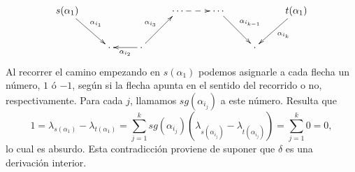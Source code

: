 \documentclass[a4paper,oneside,fleqn,11pt,../tesis.tex]{subfiles}
\begin{document}
\begin{example}
	\begin{align*}
		\xymatrix{
			s(\alpha_1) \ar[rd]^{\alpha_{i_1}} & & & \cdots \ar@{-->}[r]& \cdots\ar[dr]^{\alpha_{i_{k - 1}}} & & t(\alpha_1) \ar[ld]^{\alpha_{i_k}}\\
			& \cdot & \cdot \ar[l]^{\alpha_{i_2}} \ar[ru]^{\alpha_{i_3}}& & & \cdot &
		}
	\end{align*}
	Al recorrer el camino empezando en $s(\alpha_1)$ podemos asignarle a cada flecha un número, $1$ ó $-1$, según si la flecha apunta en el sentido del
	recorrido o no, respectivamente. Para cada $j$, llamamos $sg(\alpha_{i_j})$ a este número. Resulta que
	\[
		1 = 	\lambda_{s(\alpha_1)} - \lambda_{t(\alpha_1)}
			= \sum_{j = 1}^{k}sg(\alpha_{i_j})\left(\lambda_{s(\alpha_{i_j})} - \lambda_{t(\alpha_{i_j})}\right)
				=  \sum_{j = 1}^{k} 0  = 0,
	\]
	lo cual es absurdo. Esta contradicción proviene de suponer que $\delta$ es una derivación interior.
\end{example}
\end{document}
